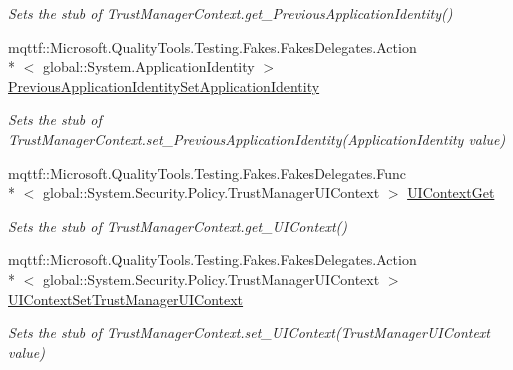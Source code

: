 \begin{DoxyCompactItemize}
\begin{DoxyCompactList}\small\item\em Sets the stub of Trust\-Manager\-Context.\-get\-\_\-\-Previous\-Application\-Identity()\end{DoxyCompactList}\item 
mqttf\-::\-Microsoft.\-Quality\-Tools.\-Testing.\-Fakes.\-Fakes\-Delegates.\-Action\\*
$<$ global\-::\-System.\-Application\-Identity $>$ \hyperlink{class_system_1_1_security_1_1_policy_1_1_fakes_1_1_stub_trust_manager_context_ae067e517bf728a77f107e76cf49f6c93}{Previous\-Application\-Identity\-Set\-Application\-Identity}
\begin{DoxyCompactList}\small\item\em Sets the stub of Trust\-Manager\-Context.\-set\-\_\-\-Previous\-Application\-Identity(\-Application\-Identity value)\end{DoxyCompactList}\item 
mqttf\-::\-Microsoft.\-Quality\-Tools.\-Testing.\-Fakes.\-Fakes\-Delegates.\-Func\\*
$<$ global\-::\-System.\-Security.\-Policy.\-Trust\-Manager\-U\-I\-Context $>$ \hyperlink{class_system_1_1_security_1_1_policy_1_1_fakes_1_1_stub_trust_manager_context_a73005072109cf8ff948fcefb4a581686}{U\-I\-Context\-Get}
\begin{DoxyCompactList}\small\item\em Sets the stub of Trust\-Manager\-Context.\-get\-\_\-\-U\-I\-Context()\end{DoxyCompactList}\item 
mqttf\-::\-Microsoft.\-Quality\-Tools.\-Testing.\-Fakes.\-Fakes\-Delegates.\-Action\\*
$<$ global\-::\-System.\-Security.\-Policy.\-Trust\-Manager\-U\-I\-Context $>$ \hyperlink{class_system_1_1_security_1_1_policy_1_1_fakes_1_1_stub_trust_manager_context_a52a0c9f6adb5b02c2a9160d3353c109d}{U\-I\-Context\-Set\-Trust\-Manager\-U\-I\-Context}
\begin{DoxyCompactList}\small\item\em Sets the stub of Trust\-Manager\-Context.\-set\-\_\-\-U\-I\-Context(\-Trust\-Manager\-U\-I\-Context value)\end{DoxyCompactList}\end{DoxyCompactItemize}
